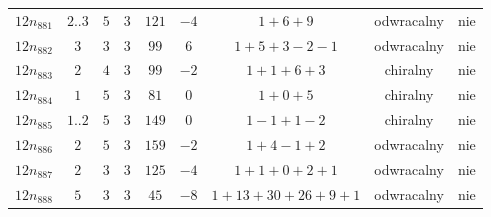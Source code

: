 \begin{longtable}{ccccccccc}
$12n_{881}$ & $2..3$ & $5$ & $3$ & $121$ & $-4$ & $1+6+9$ & odwracalny & nie \\
$12n_{882}$ & $3$ & $3$ & $3$ & $99$ & $6$ & $1+5+3-2-1$ & odwracalny & nie \\
$12n_{883}$ & $2$ & $4$ & $3$ & $99$ & $-2$ & $1+1+6+3$ & chiralny & nie \\
$12n_{884}$ & $1$ & $5$ & $3$ & $81$ & $0$ & $1+0+5$ & chiralny & nie \\
$12n_{885}$ & $1..2$ & $5$ & $3$ & $149$ & $0$ & $1-1+1-2$ & chiralny & nie \\
$12n_{886}$ & $2$ & $5$ & $3$ & $159$ & $-2$ & $1+4-1+2$ & odwracalny & nie \\
$12n_{887}$ & $2$ & $3$ & $3$ & $125$ & $-4$ & $1+1+0+2+1$ & odwracalny & nie \\
$12n_{888}$ & $5$ & $3$ & $3$ & $45$ & $-8$ & $1+13+30+26+9+1$ & odwracalny & nie \\
\hline
\end{longtable}
\normalsize
